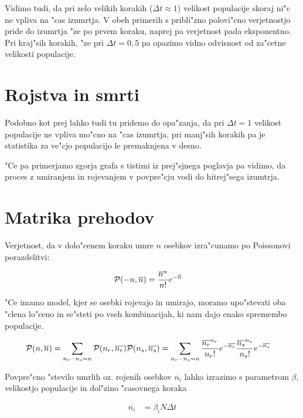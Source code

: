 \documentclass[a4paper,10pt]{article}
\begin{document}
Vidimo tudi, da pri zelo velikih korakih ($\Delta t \approx 1$) velikost populacije skoraj ni"c ne vpliva na "cas izumrtja. V obeh primerih s pribli"zno polovi"cno verjetnostjo pride do izumrtja "ze po prvem koraku, naprej pa verjetnost pada eksponentno. Pri kraj"sih korakih, "ze pri $\Delta t = 0,5$ pa opazimo vidno odvisnost od za"cetne velikosti populacije. 

\section{Rojstva in smrti}





Podobno kot prej lahko tudi tu pridemo do opa"zanja, da pri $\Delta t = 1$ velikost populacije ne vpliva mo"cno na "cas izumrtja, pri manj"sih korakih pa je statistika za ve"cjo populacijo le premaknjena v desno. 

"Ce pa primerjamo zgorja grafa s tistimi iz prej"sjnega poglavja pa vidimo, da proces z umiranjem in rojevanjem v povpre"cju vodi do hitrej"sega izumtrja. 

\section{Matrika prehodov}

Verjetnost, da v dolo"cenem koraku umre $n$ osebkov izra"cunamo po Poissonovi porazdelitvi:

\begin{align}
\mathcal P(-n, \overline n) &= \frac{\overline{n}^{n}}{n!} e^{-\overline{n}}
\end{align}

"Ce imamo model, kjer se osebki rojevajo in umirajo, moramo upo"stevati oba "clena lo"ceno in se"steti po vseh kombinacijah, ki nam dajo enako spremembo populacije. 

\begin{align}
\mathcal P(n, \overline n) &= \sum_{n_r - n_s = n}\mathcal{P}(n_r, \overline{n_r})\mathcal{P}(n_s, \overline{n_s}) = \sum_{n_r - n_s = n}\frac{\overline{n_r}^{n_r}}{n_r!} e^{-\overline{n_r}}\frac{\overline{n_s}^{n_s}}{n_s!} e^{-\overline{n_s}}  
\end{align}

Povpre"cno "stevilo umrlih oz. rojenih osebkov $\overline{n_i}$ lahko izrazimo s parametrom $\beta$, velikostjo populacije in dol"zino "casovnega koraka

\begin{align}
  \overline{n_i} &= \beta_i N \Delta t
\end{align}
\end{document}
